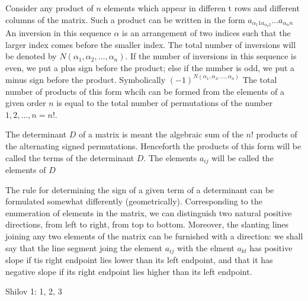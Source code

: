 \documentclass[11pt]{article} %
\newenvironment{definition}[1][Definition]{\begin{trivlist}
\item[\hskip \labelsep {\bfseries #1}]}{\end{trivlist}}
\newenvironment{assignment}[1][Assignment]{\begin{trivlist}
\item[\hskip \labelsep {\bfseries #1}]}{\end{trivlist}}
\begin{document}
\begin{definition}
	Consider any product of $n$ elements which appear in differen t rows and different columns of the matrix. Such a product can be written in the form
	{\center
		$a_{\alpha_{1}1a_{\alpha_{2}2}}\ldots$$a_{\alpha_{n}n}$
	\\}
An inversion in this sequence $\alpha$ is an arrangement of two indices such that the larger index comes before the smaller index. The total number of inversions will be denoted by $N(\alpha_1,\alpha_2,\ldots,\alpha_n)$. If the number of inversions in this sequence is even, we put a plus sign before the product; else if the number is odd, we put a minus sign before the product. Symbolically
	{\center
		$(-1)^{N(\alpha_1,\alpha_2,\ldots,\alpha_n)}$ 
	}
The total number of products of this form whcih can be formed from the elements of a given order $n$ is equal to the total number of permutations of the number $1, 2, \ldots, n = n!$.
\end{definition}

\begin{definition}
	The determinant $D$ of a matrix is meant the algebraic sum of the $n!$ products of the alternating signed permutations. Henceforth the products of this form will be called the terms of the determinant $D$. The elements $a_{ij}$ will be called the elements of $D$
\end{definition}

\begin{definition}
	The rule for determining the sign of a given term of a determinant can be formulated somewhat differently (geometrically). Corresponding to the enumeration of elements in the matrix, we can distinguish two natural positive directions, from left to right, from top to bottom. Moreover, the slanting lines joining any two elements of the matrix can be furnished with a direction: we shall say that the line segment joing the element $a_{ij}$ with the elment $a_{kl}$ has positive slope if tis right endpoint lies lower than its left endpoint, and that it has negative slope if its right endpoint lies higher than its left endpoint. 
\end{definition}

\begin{assignment}
	Shilov 1: 1, 2, 3
\end{assignment}
\end{document}
